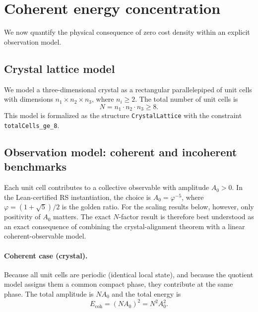 \documentclass[prb,twocolumn,nofootinbib,superscriptaddress]{revtex4-2}
\newcommand{\phig}{\varphi}
\newcommand{\lean}[1]{\texttt{\small #1}}
\begin{document}
\section{Coherent energy concentration}
\label{sec:concentration}

We now quantify the physical consequence of zero cost density within an explicit observation model.

\subsection{Crystal lattice model}

We model a three-dimensional crystal as a rectangular parallelepiped of unit cells with dimensions $n_1 \times n_2 \times n_3$, where $n_i \geq 2$.
The total number of unit cells is
\begin{equation}
N = n_1 \cdot n_2 \cdot n_3 \geq 8.
\label{eq:N}
\end{equation}
This model is formalized as the structure \lean{CrystalLattice} with the constraint \lean{totalCells\_ge\_8}.

\subsection{Observation model: coherent and incoherent benchmarks}

Each unit cell contributes to a collective observable with amplitude $A_0 > 0$.
In the Lean-certified RS instantiation, the choice is $A_0 = \phig^{-5}$, where $\phig = (1+\sqrt{5})/2$ is the golden ratio.
For the scaling results below, however, only positivity of $A_0$ matters.
The exact $N$-factor result is therefore best understood as an exact consequence of combining the crystal-alignment theorem with a linear coherent-observable model.

\paragraph{Coherent case (crystal).}
Because all unit cells are periodic (identical local state), and because the quotient model assigns them a common compact phase, they contribute at the same phase.
The total amplitude is $N A_0$ and the total energy is
\begin{equation}
E_{\mathrm{coh}} = (N A_0)^2 = N^2 A_0^2.
\label{eq:E_coh}
\end{equation}
\end{document}
